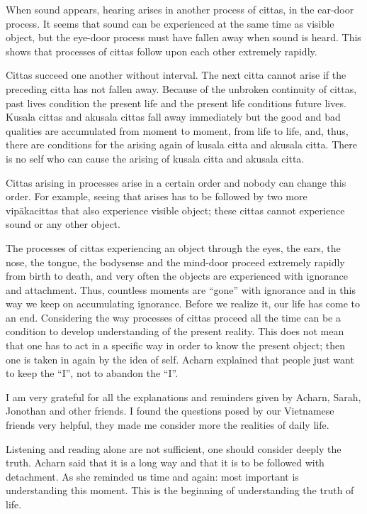 When sound appears, hearing arises in another process of cittas, in the
ear-door process. It seems that sound can be experienced at the same
time as visible object, but the eye-door process must have fallen away
when sound is heard. This shows that processes of cittas follow upon
each other extremely rapidly.

Cittas succeed one another without interval. The next citta cannot arise
if the preceding citta has not fallen away. Because of the unbroken
continuity of cittas, past lives condition the present life and the
present life conditions future lives. Kusala cittas and akusala cittas
fall away immediately but the good and bad qualities are accumulated
from moment to moment, from life to life, and, thus, there are
conditions for the arising again of kusala citta and akusala citta.
There is no self who can cause the arising of kusala citta and akusala
citta.

Cittas arising in processes arise in a certain order and nobody can
change this order. For example, seeing that arises has to be followed by
two more vipākacittas that also experience visible object; these cittas
cannot experience sound or any other object.

The processes of cittas experiencing an object through the eyes, the
ears, the nose, the tongue, the bodysense and the mind-door proceed
extremely rapidly from birth to death, and very often the objects are
experienced with ignorance and attachment. Thus, countless moments are
``gone'' with ignorance and in this way we keep on accumulating
ignorance. Before we realize it, our life has come to an end.
Considering the way processes of cittas proceed all the time can be a
condition to develop understanding of the present reality. This does not
mean that one has to act in a specific way in order to know the present
object; then one is taken in again by the idea of self. Acharn explained
that people just want to keep the ``I'', not to abandon the ``I''.

I am very grateful for all the explanations and reminders given by
Acharn, Sarah, Jonothan and other friends. I found the questions posed
by our Vietnamese friends very helpful, they made me consider more the
realities of daily life.

Listening and reading alone are not sufficient, one should consider
deeply the truth. Acharn said that it is a long way and that it is to be
followed with detachment. As she reminded us time and again: most
important is understanding this moment. This is the beginning of
understanding the truth of life.

